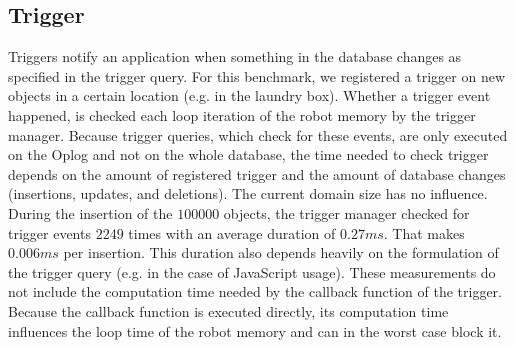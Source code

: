 \subsection{Trigger}
\label{sec:eval-trigger}
Triggers notify an application when something in the database changes
as specified in the trigger query. For this benchmark, we registered a
trigger on new objects in a certain location (e.g. in the laundry
box). Whether a trigger event happened, is checked each loop iteration of
the robot memory by the trigger manager. Because trigger queries,
which check for these events, are only executed on the Oplog and not
on the whole database, the time needed to check trigger depends on the
amount of registered trigger and the amount of database changes
(insertions, updates, and deletions). The current domain size has no
influence. During the insertion of the $100000$ objects, the trigger
manager checked for trigger events $2249$ times with an average
duration of $0.27ms$. That makes $0.006ms$ per insertion. This
duration also depends heavily on the formulation of the trigger query
(e.g. in the case of JavaScript usage). These measurements do not
include the computation time needed by the callback function of the
trigger. Because the callback function is executed directly, its
computation time influences the loop time of the robot memory and can
in the worst case block it.

